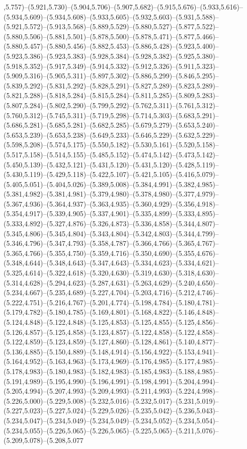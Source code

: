 ,5.757)--(5.921,5.730)--(5.904,5.706)--(5.907,5.682)--(5.915,5.676)--(5.933,5.616)--(5.934,5.609)--(5.934,5.608)--(5.933,5.605)--(5.932,5.603)--(5.931,5.588)--(5.921,5.572)--(5.913,5.568)--(5.889,5.529)--(5.880,5.527)--(5.877,5.522)--(5.880,5.506)--(5.881,5.501)--(5.878,5.500)--(5.878,5.471)--(5.877,5.466)--(5.880,5.457)--(5.880,5.456)--(5.882,5.453)--(5.886,5.428)--(5.923,5.400)--(5.923,5.386)--(5.923,5.383)--(5.928,5.384)--(5.928,5.382)--(5.925,5.380)--(5.918,5.352)--(5.917,5.349)--(5.914,5.332)--(5.912,5.326)--(5.911,5.323)--(5.909,5.316)--(5.905,5.311)--(5.897,5.302)--(5.886,5.299)--(5.846,5.295)--(5.839,5.292)--(5.831,5.292)--(5.828,5.291)--(5.827,5.289)--(5.823,5.289)--(5.821,5.288)--(5.818,5.284)--(5.815,5.284)--(5.811,5.285)--(5.809,5.283)--(5.807,5.284)--(5.802,5.290)--(5.799,5.292)--(5.762,5.311)--(5.761,5.312)--(5.760,5.312)--(5.745,5.311)--(5.719,5.298)--(5.714,5.303)--(5.683,5.291)--(5.686,5.281)--(5.685,5.281)--(5.682,5.285)--(5.679,5.279)--(5.653,5.240)--(5.653,5.239)--(5.653,5.238)--(5.649,5.233)--(5.646,5.229)--(5.632,5.229)--(5.598,5.208)--(5.574,5.175)--(5.550,5.182)--(5.530,5.161)--(5.520,5.158)--(5.517,5.158)--(5.514,5.155)--(5.485,5.152)--(5.474,5.142)--(5.473,5.142)--(5.450,5.139)--(5.432,5.121)--(5.431,5.120)--(5.431,5.120)--(5.428,5.119)--(5.430,5.119)--(5.429,5.118)--(5.422,5.107)--(5.421,5.105)--(5.416,5.079)--(5.405,5.051)--(5.404,5.026)--(5.389,5.008)--(5.384,4.991)--(5.382,4.985)--(5.381,4.982)--(5.381,4.981)--(5.379,4.980)--(5.378,4.980)--(5.377,4.979)--(5.367,4.936)--(5.364,4.937)--(5.363,4.935)--(5.360,4.929)--(5.356,4.918)--(5.354,4.917)--(5.339,4.905)--(5.337,4.901)--(5.335,4.899)--(5.333,4.895)--(5.333,4.892)--(5.327,4.876)--(5.326,4.873)--(5.336,4.858)--(5.344,4.807)--(5.345,4.806)--(5.345,4.804)--(5.343,4.804)--(5.342,4.803)--(5.344,4.799)--(5.346,4.796)--(5.347,4.793)--(5.358,4.787)--(5.366,4.766)--(5.365,4.767)--(5.365,4.766)--(5.355,4.750)--(5.359,4.716)--(5.350,4.690)--(5.355,4.676)--(5.348,4.644)--(5.348,4.643)--(5.347,4.643)--(5.334,4.623)--(5.334,4.621)--(5.325,4.614)--(5.322,4.618)--(5.320,4.630)--(5.319,4.630)--(5.318,4.630)--(5.314,4.628)--(5.294,4.623)--(5.287,4.631)--(5.263,4.629)--(5.240,4.650)--(5.234,4.667)--(5.235,4.689)--(5.227,4.704)--(5.203,4.716)--(5.212,4.746)--(5.222,4.751)--(5.216,4.767)--(5.201,4.774)--(5.198,4.784)--(5.180,4.781)--(5.179,4.782)--(5.180,4.785)--(5.169,4.801)--(5.168,4.822)--(5.146,4.848)--(5.124,4.848)--(5.122,4.848)--(5.125,4.853)--(5.125,4.855)--(5.125,4.856)--(5.126,4.857)--(5.125,4.858)--(5.123,4.857)--(5.122,4.858)--(5.122,4.858)--(5.122,4.859)--(5.123,4.859)--(5.127,4.860)--(5.128,4.861)--(5.140,4.877)--(5.136,4.885)--(5.150,4.889)--(5.148,4.914)--(5.156,4.922)--(5.153,4.941)--(5.164,4.952)--(5.163,4.963)--(5.173,4.969)--(5.176,4.985)--(5.177,4.985)--(5.178,4.983)--(5.180,4.983)--(5.182,4.983)--(5.185,4.983)--(5.188,4.985)--(5.191,4.989)--(5.195,4.990)--(5.196,4.991)--(5.198,4.991)--(5.204,4.994)--(5.205,4.994)--(5.207,4.993)--(5.209,4.993)--(5.211,4.993)--(5.224,4.998)--(5.226,5.000)--(5.229,5.008)--(5.232,5.016)--(5.232,5.017)--(5.231,5.019)--(5.227,5.023)--(5.227,5.024)--(5.229,5.026)--(5.235,5.042)--(5.236,5.043)--(5.234,5.047)--(5.234,5.049)--(5.234,5.049)--(5.234,5.052)--(5.234,5.054)--(5.234,5.055)--(5.226,5.065)--(5.226,5.065)--(5.225,5.065)--(5.211,5.076)--(5.209,5.078)--(5.208,5.077